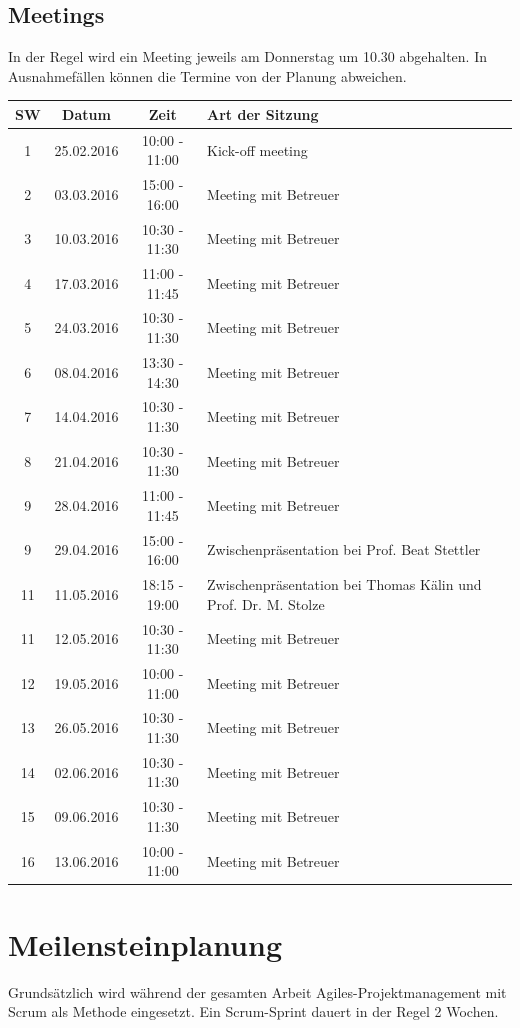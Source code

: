 \subsection{Meetings}
In der Regel wird ein Meeting jeweils am Donnerstag um 10.30 abgehalten. In Ausnahmefällen können die Termine von der Planung abweichen.
  \\[1\normalbaselineskip]
\begin{tabularx}{\textwidth}{|c|c|c|X|}
  \hline
  \textbf{SW} & \textbf{Datum} & \textbf{Zeit} & \textbf{Art der Sitzung} \\
  \hline \hline
  1 & 25.02.2016 & 10:00 - 11:00 &  Kick-off meeting \\
  2 & 03.03.2016 & 15:00 - 16:00 &  Meeting mit Betreuer \\
  3 & 10.03.2016 & 10:30 - 11:30 &  Meeting mit Betreuer \\
  4 & 17.03.2016 & 11:00 - 11:45 &  Meeting mit Betreuer \\
  5 & 24.03.2016 & 10:30 - 11:30 &  Meeting mit Betreuer \\
  6 & 08.04.2016 & 13:30 - 14:30 &  Meeting mit Betreuer \\
  7 & 14.04.2016 & 10:30 - 11:30 &  Meeting mit Betreuer \\
  8 & 21.04.2016 & 10:30 - 11:30 &  Meeting mit Betreuer \\
  9 & 28.04.2016 & 11:00 - 11:45 &  Meeting mit Betreuer \\
  9 & 29.04.2016 & 15:00 - 16:00 &  Zwischenpräsentation bei Prof. Beat Stettler \\
  11 & 11.05.2016 & 18:15 - 19:00 &  Zwischenpräsentation bei Thomas Kälin und Prof. Dr. M. Stolze \\
  11 & 12.05.2016 & 10:30 - 11:30 &  Meeting mit Betreuer \\
  12 & 19.05.2016 & 10:00 - 11:00 &  Meeting mit Betreuer \\
  13 & 26.05.2016 & 10:30 - 11:30 &  Meeting mit Betreuer \\
  14 & 02.06.2016 & 10:30 - 11:30 &  Meeting mit Betreuer \\
  15 & 09.06.2016 & 10:30 - 11:30 &  Meeting mit Betreuer \\
  16 & 13.06.2016 & 10:00 - 11:00 &  Meeting mit Betreuer \\
  \hline
\end{tabularx}
\newpage
\section{Meilensteinplanung}
Grundsätzlich wird während der gesamten Arbeit Agiles-Projektmanagement mit Scrum als Methode eingesetzt. Ein Scrum-Sprint dauert in der Regel 2 Wochen.

